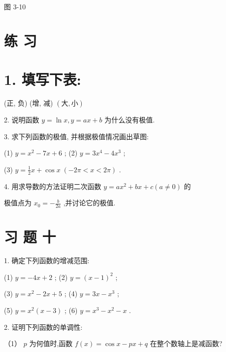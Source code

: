 \documentclass[10pt]{article}
\begin{document}
图 3-10

\section*{练 习}

\section*{1. 填写下表:}

\begin{center}
\end{center}

(正, 负) (增, 减) \(\left( {大,小}\right)\)

2. 说明函数 \(y = \ln x,y = {ax} + b\) 为什么没有极值.

3. 求下列函数的极值, 并根据极值情况画出草图:

(1) \(y = {x}^{2} - {7x} + 6\) ; (2) \(y = 3{x}^{4} - 4{x}^{3}\) ;

(3) \(y = \frac{1}{2}x + \cos x\;\left( {-{2\pi } < x < {2\pi }}\right)\) .

4. 用求导数的方法证明二次函数 \(y = a{x}^{2} + {bx} + c\left( {a \neq 0}\right)\) 的

极值点为 \({x}_{0} = - \frac{b}{2a}\) ,并讨论它的极值.

\section*{习 题 十}

1. 确定下列函数的增减范围:

(1) \(y = - {4x} + 2\) ; (2) \(y = {\left( x - 1\right) }^{2}\) ;

(3) \(y = {x}^{2} - {2x} + 5\) ; (4) \(y = {3x} - {x}^{3}\) ;

(5) \(y = {x}^{2}\left( {x - 3}\right)\) ; (6) \(y = {x}^{3} - {x}^{2} - x\) .

2. 证明下列函数的单调性:

（1） \(p\) 为何值时,函数 \(f\left( x\right) = \cos x - {px} + q\) 在整个数轴上是减函数?
\end{document}
